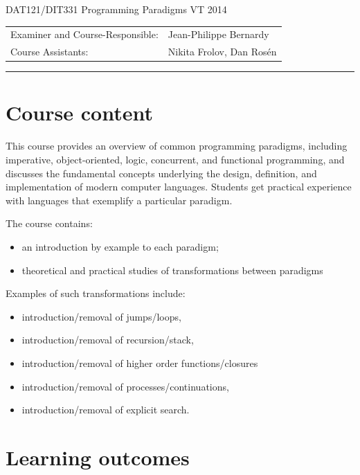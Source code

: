 \documentclass[oneside,11pt]{article}
\begin{document}
{
\vspace{1cm}
\huge
DAT121/DIT331 Programming Paradigms VT 2014
\vspace{1cm}
}

{\bf
\begin{tabular}[t]{ll}
Examiner and Course-Responsible: & Jean-Philippe Bernardy\\
Course Assistants: & Nikita Frolov, Dan Rosén
\end{tabular}
}
\hrule

\section*{Course content}

This course provides an overview of common programming paradigms,
including imperative, object-oriented, logic, concurrent, and
functional programming, and discusses the fundamental concepts
underlying the design, definition, and implementation of modern
computer languages. Students get practical experience with languages
that exemplify a particular paradigm.

The course contains:
\begin{itemize}
\item an introduction by example to each paradigm;
\item theoretical and practical studies of transformations between
  paradigms
\end{itemize}

Examples of such transformations include:
\begin{itemize}
  \item introduction/removal of jumps/loops,
  \item introduction/removal of recursion/stack,
  \item introduction/removal of higher order functions/closures
  \item introduction/removal of processes/continuations,
  \item introduction/removal of explicit search.
\end{itemize}

\section*{Learning outcomes}
\end{document}
